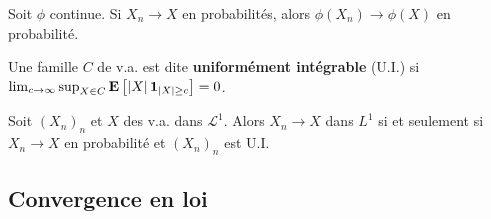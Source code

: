 	\begin{cor}[Slutsky]
		Soit $\phi$ continue.
		Si $X_n \longrightarrow X$ en probabilités, alors $\phi(X_n) \longrightarrow \phi(X)$ en probabilité.
	\end{cor}

	\begin{defn}
		Une famille $C$ de v.a. est dite \textbf{uniformément intégrable} (U.I.) si $\lim_{c \to \infty} \sup_{X \in C} \mathbf{E} \left[ \left\lvert X\right\rvert \operatorname{\mathbf{1}}_{\left\lvert X\right\rvert \geq c} \right] = 0$.
	\end{defn}

	\begin{thm}
		Soit $(X_n)_n$ et $X$ des v.a. dans $\mathcal{L}^1$.
		Alors $X_n \longrightarrow  X$ dans $L^1$ si et seulement si $X_n \longrightarrow X$ en probabilité et $(X_n)_n$ est U.I.
	\end{thm}


\subsection{Convergence en loi}

	

